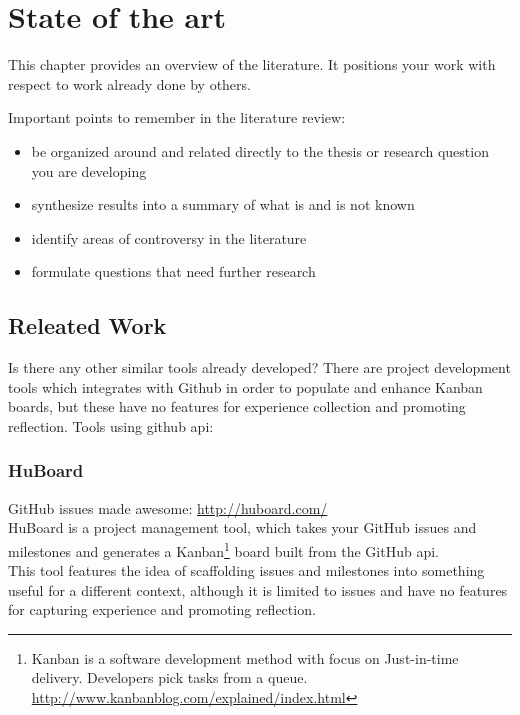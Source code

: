 
\chapter{State of the art}
This chapter provides an overview of the literature. It positions your work with respect to
work already done by others.

Important points to remember in the literature review:
\begin{itemize}
\item be organized around and related directly to the thesis or research question you are developing
\item synthesize results into a summary of what is and is not known
\item identify areas of controversy in the literature
\item formulate questions that need further research
\end{itemize}

\section{Releated Work}
Is there any other similar tools already developed? There are project development tools which integrates with Github in order to populate and enhance Kanban boards, but these have no features for experience collection and promoting reflection. 
Tools using github api: \\
\subsection*{HuBoard}
GitHub issues made awesome: \url{http://huboard.com/} \\
HuBoard is a project management tool, which takes your GitHub issues and milestones and generates a Kanban\footnote{Kanban is a software development method with focus on Just-in-time delivery. Developers pick tasks from a queue. \url{http://www.kanbanblog.com/explained/index.html}} board built from the GitHub api. \\
This tool features the idea of scaffolding issues and milestones into something useful for a different context, although it is limited to issues and have no features for capturing experience and promoting reflection. 
